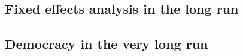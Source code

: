 \documentclass[11pt, a4paper, leqno]{article}
\begin{document}




\clearpage





\clearpage

\subsection{Fixed effects analysis in the long run}



\clearpage

\subsection{Democracy in the very long run}





\clearpage
{}
\printbibliography
{}

\end{document}
